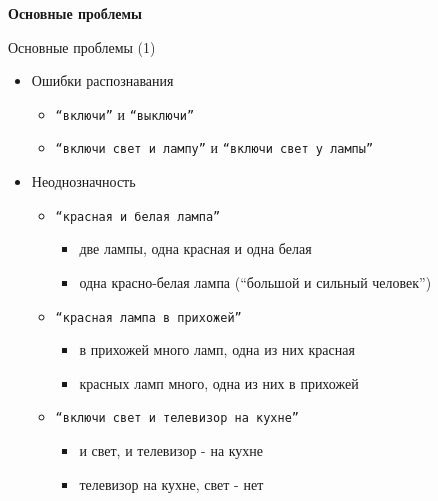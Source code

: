 \documentclass{beamer}
\begin{document}
\begin{frame}{}
\begin{center}
	\textbf{Основные проблемы}\\
\end{center}
\end{frame}


\begin{frame}{Основные проблемы (1)}
\begin{itemize}
	\item Ошибки распознавания
	\bigskip
		\begin{itemize}
			\item \texttt{``включи''} и \texttt{``выключи''}
			\item \texttt{``включи свет и лампу''} и \texttt{``включи свет у лампы''}
		\end{itemize}
		\bigskip
	\item Неоднозначность
	\bigskip
		\begin{itemize}
			\item \texttt{``красная и белая лампа''}
				\begin{itemize}
					\item две лампы, одна красная и одна белая
					\item одна красно-белая лампа (``большой и сильный человек'')
				\end{itemize}
			\item \texttt{``красная лампа в прихожей''}
				\begin{itemize}
					\item в прихожей много ламп, одна из них красная
					\item красных ламп много, одна из них в прихожей
				\end{itemize}
			\item \texttt{``включи свет и телевизор на кухне''}
				\begin{itemize}
					\item и свет, и телевизор - на кухне
					\item телевизор на кухне, свет - нет
				\end{itemize}
		\end{itemize}
\end{itemize}
\end{frame}
\end{document}
